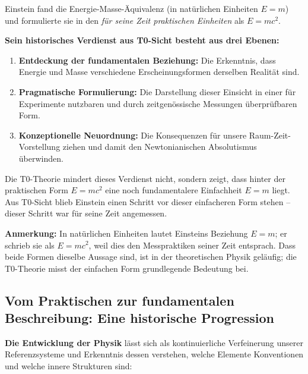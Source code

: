 	\begin{tcolorbox}[colback=green!10!white,colframe=green!75!black,title=Einsteins Leistung aus T0-Sicht]
		Einstein fand die Energie-Masse-Äquivalenz (in natürlichen Einheiten \( E = m \)) und formulierte sie in den \textit{für seine Zeit praktischen Einheiten} als \( E = mc^2 \).
		
		\textbf{Sein historisches Verdienst aus T0-Sicht besteht aus drei Ebenen:}
		
		\begin{enumerate}
			\item \textbf{Entdeckung der fundamentalen Beziehung:} Die Erkenntnis, dass Energie und Masse verschiedene Erscheinungsformen derselben Realität sind.
			
			\item \textbf{Pragmatische Formulierung:} Die Darstellung dieser Einsicht in einer für Experimente nutzbaren und durch zeitgenössische Messungen überprüfbaren Form.
			
			\item \textbf{Konzeptionelle Neuordnung:} Die Konsequenzen für unsere Raum-Zeit-Vorstellung ziehen und damit den Newtonianischen Absolutismus überwinden.
		\end{enumerate}
		
		Die T0-Theorie mindert dieses Verdienst nicht, sondern zeigt, dass hinter der praktischen Form \( E = mc^2 \) eine noch fundamentalere Einfachheit \( E = m \) liegt. Aus T0-Sicht blieb Einstein einen Schritt vor dieser einfacheren Form stehen – dieser Schritt war für seine Zeit angemessen.
		
		\textbf{Anmerkung:} In natürlichen Einheiten lautet Einsteins Beziehung \( E = m \); er schrieb sie als \( E = mc^2 \), weil dies den Messpraktiken seiner Zeit entsprach. Dass beide Formen dieselbe Aussage sind, ist in der theoretischen Physik geläufig; die T0-Theorie misst der einfachen Form grundlegende Bedeutung bei.
	\end{tcolorbox}
	
	\subsection{Vom Praktischen zur fundamentalen Beschreibung: Eine historische Progression}
	
	\textbf{Die Entwicklung der Physik} lässt sich als kontinuierliche Verfeinerung unserer Referenzsysteme und Erkenntnis dessen verstehen, welche Elemente Konventionen und welche innere Strukturen sind:
	
